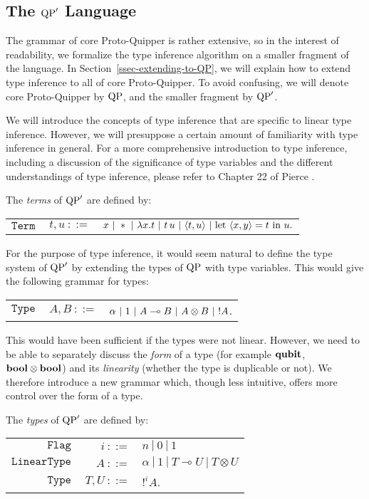 
\subsection{The ${\rm QP}'$ Language}

The grammar of core Proto-Quipper is rather extensive, so in the interest of readability, we formalize the type inference algorithm on a smaller fragment of the language. In Section~\ref{ssec-extending-to-QP}, we will explain how to extend type inference to all of core Proto-Quipper. To avoid confusing, we will denote core Proto-Quipper by ${\rm QP}$, and the smaller fragment by ${\rm QP}'$.

We will introduce the concepts of type inference that are specific to
linear type inference. However, we will presuppose a certain amount of
familiarity with type inference in general.  For a more comprehensive
introduction to type inference, including a discussion of the
significance of type variables and the different understandings of
type inference, please refer to Chapter 22 of Pierce {\cite{pierce02}}.

\begin{defn} The \emph{terms} of ${\rm QP}'$ are defined by:
	\begin{center}
	\begin{tabular}{rrl}
		$\texttt{Term}$&$ ~t,u~ ::=$ & $x ~|~ * ~|~ \lambda x.t ~|~ t \, u ~|~ \langle t, u \rangle ~|~ \text{let}~ \langle x, y \rangle = t ~\text{in}~ u. $
	\end{tabular}
	\end{center}
\end{defn}

For the purpose of type inference, it would seem natural to define the type system of ${\rm QP}'$ by extending the types of ${\rm QP}$ with type variables. This would give the following grammar for types:
	\begin{center}
	\begin{tabular}{rrl}
		$\texttt{Type}$&$ ~A,B~ ::=$ & $\alpha ~|~ 1 ~|~ A \multimap B ~|~ A \otimes B ~|~ {!} A$.
	\end{tabular}
	\end{center}
This would have been sufficient if the types were not linear. However, we need to be able to separately discuss the \textit{form} of a type (for example $\textrm{\bf qubit}$, $\textrm{\bf bool} \otimes \textrm{\bf bool}$) and its \textit{linearity} (whether the type is duplicable or not). We therefore introduce a new grammar which, though less intuitive, offers more control over the form of a type.

\begin{defn} The \emph{types} of ${\rm QP}'$ are defined by:
	\begin{center}
	\begin{tabular}{rrl}
		$\texttt{Flag}$&$~i~ ::=$ & $n ~|~ 0 ~|~ 1$ \\		
		$\texttt{LinearType}$&$ ~A~ ::=$ & $\alpha ~|~ 1 ~|~ T \multimap U ~|~ T \otimes U$ \\
		$\texttt{Type}$&$ ~T,U~ ::=$ & $!^i A$.
	\end{tabular}
	\end{center}
\end{defn}

